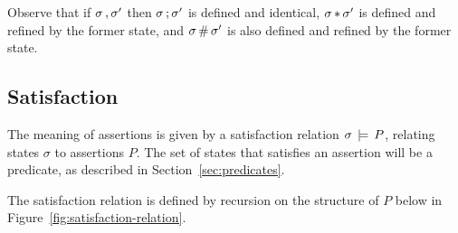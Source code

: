 \documentclass[11pt]{article}
\begin{document}
Observe that if $\sigma \operatorname{,} \sigma'$ then $\sigma \operatorname{;} \sigma'$ is defined and identical, $\sigma \operatorname{\ast} \sigma'$ is defined and refined by the former state, and $\sigma \operatorname{\#} \sigma'$ is also defined and refined by the former state.

\subsection{Satisfaction}

The meaning of assertions is given by a satisfaction relation $\sigma \,\models\, P$, relating states $\sigma$ to assertions $P$. The set of states that satisfies an assertion will be a predicate, as described in Section~\ref{sec:predicates}. 

The satisfaction relation is defined by recursion on the structure of $P$ below in Figure~\ref{fig:satisfaction-relation}. 
\end{document}

